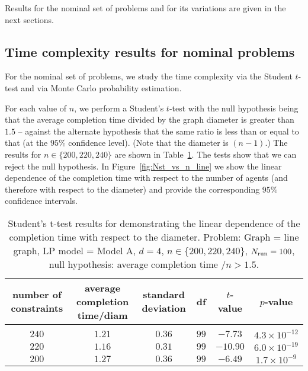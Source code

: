 \documentclass[onecolumn,journal,letterpaper]{IEEEtran}
\newcommand{\subscr}[2]{{#1}_{\textup{#2}}}
\begin{document}
Results for the nominal set of problems and for its variations are given in
the next sections.


\subsection{Time complexity results for nominal problems}
For the nominal set of problems, we study the time complexity via the
Student $t$-test and via Monte Carlo probability estimation.

For each value of $n$, we perform a Student's $t$-test with the null
hypothesis being that the average completion time divided by the graph
diameter is greater than $1.5$ -- against the alternate hypothesis that the
same ratio is less than or equal to that (at the $95\%$ confidence
level). (Note that the diameter is $(n-1)$.) The results for
$n\in\{200,220,240\}$ are shown in Table~\ref{tab:ttest}. The tests show
that we can reject the null hypothesis.
In Figure~\ref{fig:Nst_vs_n_line} we show the linear dependence of the
completion time with respect to the number of agents (and therefore with
respect to the diameter) and provide the corresponding $95\%$ confidence
intervals.


\begin{table}[h]
  \begin{center}
\setlength{\tabcolsep}{4pt}
    \begin{tabular}[c]{cccccc}
      \parbox{.16\linewidth}{number of constraints} &
      \parbox{.16\linewidth}{average completion time/diam} &
      \parbox{.15\linewidth}{standard deviation} &
      df &
      $t$-value &
      $p$-value \\[.75em] \hline
      \\[-.75em]
$240$ & $1.21$ & $0.36$ & $99$ & $-7.73$ & $4.3 \times 10^{-12}$\\
$220$ & $1.16$ & $0.31$ & $99$ & $-10.90$ & $6.0 \times 10^{-19}$\\
$200$ & $1.27$ & $0.36$ & $99$ & $-6.49$ & $1.7 \times 10^{-9}$
    \end{tabular}
    \caption{Student's t-test results for demonstrating the linear
      dependence of the completion time with respect to the
      diameter. Problem: Graph = line graph, LP model = Model A, $d=4$,
      $n\in\{200,220,240\}$, $\subscr{N}{run}=100$, null hypothesis:
      average completion time $/ n > 1.5$.}
\label{tab:ttest}
\end{center}
\end{table}
\end{document}
